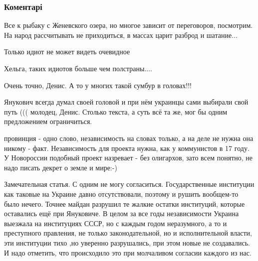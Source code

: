 
 
 
 
 
\subsubsection{Коментарі}
\label{sec:31_08_2014.fb.zharkih_denis.3.strana_janukovich.cmt}

\begin{itemize} %

Все к рыбаку с Женевского озера, но многое зависит от переговоров, посмотрим. На
народ рассчитывать не приходиться, в массах царит разброд и шатание...

Только идиот не может видеть очевидное

Хельга, таких идиотов больше чем полстраны....

Очень точно, Денис. А то у многих такой сумбур в головах!!!


Янукович всегда думал своей головой и при нём украинцы сами выбирали свой путь
((( молодец, Денис. Столько текста, а суть всё та же, мог бы одним предложением
ограничиться.


провинция - одно слово, независимость на словах только, а на деле не нужна она
никому - факт. Независимость для проекта нужна, как у коммунистов в 17 году. У
Новороссии подобный проект назревает - без олигархов, зато всем понятно, не
надо писать декрет о земле и мире:-)


Замечательная статья. С одним не могу согласиться. Государственные институции как
таковые на Украине давно отсутствовали, поэтому и рушить вообщем-то было
нечего. Точнее майдан разрушил те жалкие остатки институций, которые оставались
ещё при Януковиче. В целом за все годы независимости Украина выезжала на
институциях СССР, но с каждым годом неразумного, а то и преступного правления, не
только законодательной, но и исполнительной власти, эти институции тихо ,но
уверенно разрушались, при этом новые не создавались. И надо отметить, что
происходило это при молчаливом согласии каждого из нас.


\end{itemize}
